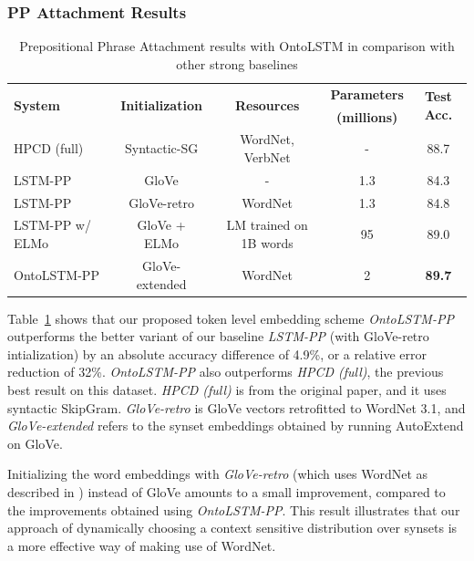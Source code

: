 \subsubsection{PP Attachment Results}\label{sec:ontolstm_pp_results}
\begin{table}
	\centering
	\begin{tabular}{lcccc}
		\toprule
		\multirow{2}{*}{\textbf{System}} &
		\multirow{2}{*}{\textbf{Initialization}} &
		\multirow{2}{*}{\textbf{Resources}} & \textbf{Parameters} & 
		\multirow{2}{*}{\textbf{Test Acc.}}\\
		& & & \textbf{(millions)} & \\
		\midrule
		HPCD (full) & Syntactic-SG & WordNet, VerbNet & - & 88.7 \\
		\midrule
		LSTM-PP & GloVe & - & 1.3 & 84.3 \\
		LSTM-PP & GloVe-retro & WordNet & 1.3 & 84.8 \\
		LSTM-PP w/ ELMo & GloVe + ELMo & LM trained on 1B words &
		95 & 89.0 \\
		OntoLSTM-PP & GloVe-extended & WordNet & 2 & \textbf{89.7} \\
		\bottomrule
	\end{tabular}
	\caption{Prepositional Phrase Attachment results with OntoLSTM in
	comparison with other strong baselines}\label{tab:ontolstm_direct_ppa_results}
\end{table}

Table~\ref{tab:ontolstm_direct_ppa_results} shows that our proposed token level
embedding scheme \textit{OntoLSTM-PP} outperforms the better variant of our
baseline \textit{LSTM-PP} (with GloVe-retro intialization) by an absolute
accuracy difference of 4.9\%, or a relative error reduction of 32\%.
\textit{OntoLSTM-PP} also outperforms \textit{HPCD (full)}, the previous best
result on this dataset. \textit{HPCD (full)} is from the original paper, and it
uses syntactic SkipGram. \textit{GloVe-retro} is GloVe vectors retrofitted
\citep{faruqui:15} to WordNet 3.1, and \textit{GloVe-extended} refers to the
synset embeddings obtained by running AutoExtend \citep{rothe:15} on GloVe.

Initializing the word embeddings with \textit{GloVe-retro} (which uses WordNet
as described in \cite{faruqui:15}) instead of GloVe amounts to a small
improvement, compared to the improvements obtained using \textit{OntoLSTM-PP}.
This result illustrates that our approach of dynamically choosing a context
sensitive distribution over synsets is a more effective way of making use of
WordNet.

